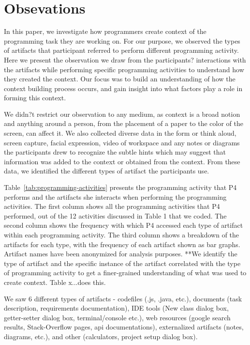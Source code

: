 
\section{Obsevations}

In this paper, we investigate how programmers create context of the programming task they are working on. For our purpose, we observed the types of artifacts that participant referred to perform different programming activity. Here we present the observation we draw from the participants? interactions with the artifacts while performing specific programming activities to understand how they created the context. Our focus was to build an understanding of how the context building process occurs, and gain insight into what factors play a role in forming this context. 

We didn?t restrict our observation to any medium, as context is a broad notion and anything around a person, from the placement of a paper to the color of the screen, can affect it. We also collected diverse data in the form or think aloud, screen capture, facial expression, video of workspace and any notes or diagrams the participants drew to recognize the subtle hints which may suggest that information was added to the context or obtained from the context. From these data, we identified the different types of artifact the participants use. 

Table~\ref{tab:programming-activities} presents the programming activity that P4 performs and the artifacts she interacts when performing the programming activities. The first column shows all the programming activities that P4 performed, out of the 12 activities discussed in Table 1 that we coded. The second column shows the frequency with which P4 accessed each type of artifact within each programming activity. The third column shows a breakdown of the artifacts for each type, with the frequency of each artifact shown as bar graphs. Artifact names have been anonymized for analysis purposes. 
**We identify the type of artifact and the specific instance of the artifact correlated with the type of programming activity to get a finer-grained understanding of what was used to create context. Table x...does this.



We saw 6 different types of artifacts - codefiles (.js, .java, etc.), documents (task description, requirements documentation), IDE tools (New class dialog box, getter-setter dialog box, terminal/console etc.), web resources (google search results, Stack-Overflow pages, api documentations), externalized artifacts (notes, diagrams, etc.), and other (calculators, project setup dialog box).

